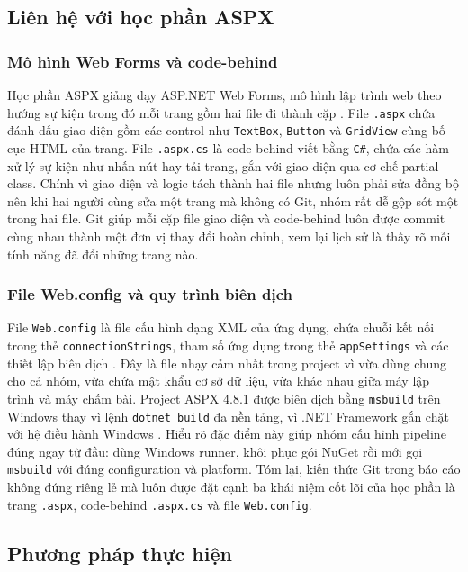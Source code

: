 \subsection{Liên hệ với học phần ASPX}

\subsubsection{Mô hình Web Forms và code-behind}

Học phần ASPX giảng dạy ASP.NET Web Forms, mô hình lập trình web theo hướng sự kiện trong đó mỗi trang gồm hai file đi thành cặp \cite{msnetfx}.
File \texttt{.aspx} chứa đánh dấu giao diện gồm các control như \texttt{TextBox}, \texttt{Button} và \texttt{GridView} cùng bố cục HTML của trang.
File \texttt{.aspx.cs} là code-behind viết bằng \texttt{C\#}, chứa các hàm xử lý sự kiện như nhấn nút hay tải trang, gắn với giao diện qua cơ chế partial class.
Chính vì giao diện và logic tách thành hai file nhưng luôn phải sửa đồng bộ nên khi hai người cùng sửa một trang mà không có Git, nhóm rất dễ gộp sót một trong hai file.
Git giúp mỗi cặp file giao diện và code-behind luôn được commit cùng nhau thành một đơn vị thay đổi hoàn chỉnh, xem lại lịch sử là thấy rõ mỗi tính năng đã đổi những trang nào.

\subsubsection{File Web.config và quy trình biên dịch}

File \texttt{Web.config} là file cấu hình dạng XML của ứng dụng, chứa chuỗi kết nối trong thẻ \texttt{connectionStrings}, tham số ứng dụng trong thẻ \texttt{appSettings} và các thiết lập biên dịch \cite{msnetfx}.
Đây là file nhạy cảm nhất trong project vì vừa dùng chung cho cả nhóm, vừa chứa mật khẩu cơ sở dữ liệu, vừa khác nhau giữa máy lập trình và máy chấm bài.
Project ASPX 4.8.1 được biên dịch bằng \verb|msbuild| trên Windows thay vì lệnh \verb|dotnet build| đa nền tảng, vì .NET Framework gắn chặt với hệ điều hành Windows \cite{msmsbuild}.
Hiểu rõ đặc điểm này giúp nhóm cấu hình pipeline đúng ngay từ đầu: dùng Windows runner, khôi phục gói NuGet rồi mới gọi \verb|msbuild| với đúng configuration và platform.
Tóm lại, kiến thức Git trong báo cáo không đứng riêng lẻ mà luôn được đặt cạnh ba khái niệm cốt lõi của học phần là trang \texttt{.aspx}, code-behind \texttt{.aspx.cs} và file \texttt{Web.config}.

\subsection{Phương pháp thực hiện}

